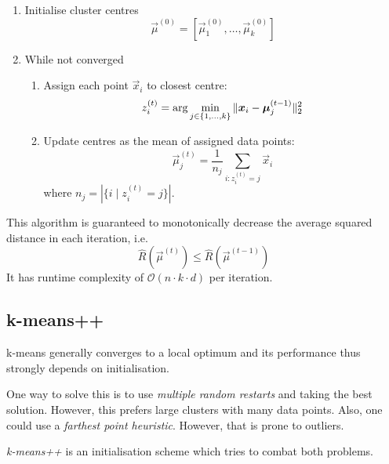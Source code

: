 \begin{enumerate}
	\item Initialise cluster centres
	\begin{equation*}
	\vec{\mu}^{(0)} = [\vec{\mu}^{(0)}_1, \dotsc, \vec{\mu}^{(0)}_k]
	\end{equation*}
	
	\item While not converged
	\begin{enumerate}
		\item Assign each point $\vec{x}_i$ to closest centre:
		\begin{equation*}
		z_i^{(t)} = \arg\min_{j \in \{1, \dotsc, k\}}{
			\lVert\boldsymbol{x}_i - \boldsymbol{\mu}_j^{(t - 1)}\rVert_2^2
		}
		\end{equation*}
		\item Update centres as the mean of assigned data points:
		\begin{equation*}
		\vec{\mu}_j^{(t)} = \frac{1}{n_j}
		\sum_{i : z_i^{(t)} = j}{\vec{x}_i}
		\end{equation*}
		where $n_j = |\{i \mid z_i^{(t)} = j\}|$.
	\end{enumerate}
\end{enumerate}

This algorithm is guaranteed to monotonically decrease
the average squared distance in each iteration, i.e.
\begin{equation*}
\hat{R}(\vec{\mu}^{(t)}) \leq \hat{R}(\vec{\mu}^{(t-1)})
\end{equation*}
It has runtime complexity of $\mathcal{O}(n \cdot k \cdot d)$
per iteration.


\subsection{k-means++}
k-means generally converges to a local optimum and its
performance thus strongly depends on initialisation.

One way to solve this is to use \emph{multiple random restarts}
and taking the best solution.
However, this prefers large clusters with many data points.
Also, one could use a \emph{farthest point heuristic}.
However, that is prone to outliers.

\emph{k-means++} is an initialisation scheme which tries
to combat both problems.

